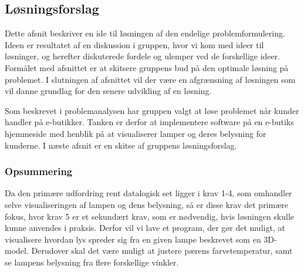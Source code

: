 \subsection{Løsningsforslag}
\label{sec:losning}
Dette afsnit beskriver en ide til løsningen af den endelige problemformulering. Ideen er resultatet af en diskussion i gruppen, hvor vi kom med ideer til løsninger, og herefter diskuterede fordele og ulemper ved de forskellige ideer. Formålet med afsnittet er at skitsere gruppens bud på den optimale løsning på problemet. I slutningen af afsnittet vil der være en afgrænsning af løsningen som vil danne grundlag for den senere udvikling af en løsning.

Som beskrevet i problemanalysen har gruppen valgt at løse problemet når kunder handler på e-butikker. Tanken er derfor at implementere software på en e-butiks hjemmeside med henblik på at visualiserer lamper og deres belysning for kunderne. I næste afsnit er en skitse af gruppens løsningsforslag.





\subsubsection*{Opsummering}

Da den primære udfordring rent datalogisk set ligger i krav 1-4, som omhandler selve visualiseringen af lampen og dens belysning, så er disse krav det primære fokus, hvor krav 5 er et sekundært krav, som er nødvendig, hvis løsningen skulle kunne anvendes i praksis. Derfor vil vi lave et program, der gør det muligt, at visualisere hvordan lys spreder sig fra en given lampe beskrevet som en 3D-model. Derudover skal det være muligt at justere pærens farvetemperatur, samt se lampens belysning fra flere forskellige vinkler. 